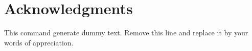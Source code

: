 
\chapter*{Acknowledgments}

This command generate dummy text. Remove this line and replace it by your words of appreciation.
